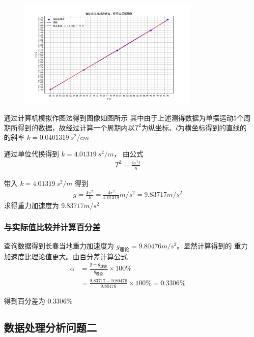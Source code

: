 \documentclass[UTF8]{ctexart}
\begin{document}
\begin{figure}[H]  %
		\centering
		\includegraphics[width=0.8\textwidth,height=0.5\textwidth]{img/单摆周期平方作图法图像.png}
		\label{fig:side:b} 
\end{figure}

通过计算机模拟作图法得到图像如图所示
其中由于上述测得数据为单摆运动5个周期所得到的数据，故经过计算一个周期内以$T^2$为纵坐标、$l$为横坐标得到的直线的的斜率 $k = 0.0401319 \  s^2/cm$

通过单位代换得到 $k = 4.01319 \ s^2/m$，
由公式
\begin{align*}
    T^2 = \frac{4\pi^2 l}{g}
\end{align*}
 
 带入 $k = 4.01319 \ s^2/m$ 得到 
\begin{align*}
    g = \frac{4 \pi^2 }{k} = \frac{4 \pi^2}{4.01319} m/s^2 = 9.83717 m/s^2
\end{align*}
 求得重力加速度为 $9.83717 m/s^2$

\subsubsection{与实际值比较并计算百分差}
查询数据得到长春当地重力加速度为 $g_{\text{理论}} = 9.80476 m/s^2$。显然计算得到的 重力加速度比理论值更大。由百分差计算公式
\begin{align*}
    \alpha &= \frac{g - g_{\text{理论}}}{g_{\text{理论}}} \times 100 \% \\ 
    &= \frac{9.83717 - 9.80476}{9.80476} \times 100 \% = 0.3306 \% 
\end{align*}

得到百分差为 $0.3306 \%$

\subsection{数据处理分析问题二}
\end{document}
